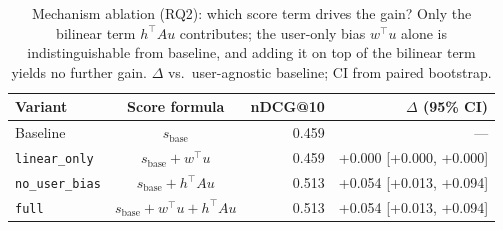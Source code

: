 \begin{table}[t]
\centering
\caption{Mechanism ablation (RQ2): which score term drives the gain? Only the bilinear term $h^\top A u$ contributes; the user-only bias $w^\top u$ alone is indistinguishable from baseline, and adding it on top of the bilinear term yields no further gain. $\Delta$ vs.\ user-agnostic baseline; CI from paired bootstrap.}
\label{tab:mechanism}
\begin{tabular}{lcrr}
\toprule
Variant & Score formula & nDCG@10 & $\Delta$ (95\% CI) \\
\midrule
Baseline & $s_{\mathrm{base}}$ & 0.459 & --- \\
\texttt{linear\_only} & $s_{\mathrm{base}} + w^\top u$ & 0.459 & +0.000 [+0.000, +0.000] \\
\texttt{no\_user\_bias} & $s_{\mathrm{base}} + h^\top A u$ & 0.513 & +0.054 [+0.013, +0.094] \\
\texttt{full} & $s_{\mathrm{base}} + w^\top u + h^\top A u$ & 0.513 & +0.054 [+0.013, +0.094] \\
\bottomrule
\end{tabular}
\end{table}
